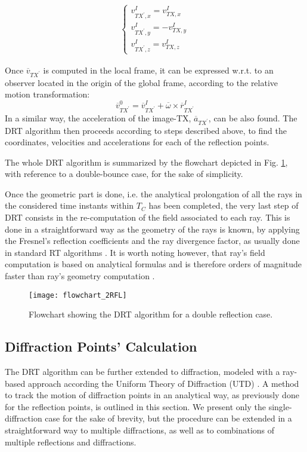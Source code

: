 \begin{equation}
\begin{gathered}
\begin{cases}
v_{TX^{'},x}^{I} = v_{TX,x}^{I} \\
v_{TX^{'},y}^{I} = -v_{TX,y}^{I} \\
v_{TX^{'},z}^{I} = v_{TX,z}^{I}
\end{cases}
\end{gathered} 
\end{equation}

Once $\overline{v}_{TX^{'}}$ is computed in the local frame, it can be expressed w.r.t. to an observer located in the origin of the global frame, according to the relative motion transformation:
\begin{equation}
\overline{v}_{TX^{'}}^{0}=\overline{v}_{TX^{'}}^{I}+\overline{\omega} \times \overline{r}_{TX^{'}}^{I}
\end{equation}
In a similar way, the acceleration of the image-TX, $\overline{a}_{TX^{'}}$, can be also found.
The DRT algorithm then proceeds according to steps described above, to find the coordinates, velocities and accelerations for each of the reflection points.
\par

The whole DRT algorithm is summarized by the flowchart depicted in Fig. \ref{flowchart}, with reference to a double-bounce case, for the sake of simplicity. 

Once the geometric part is done, i.e. the analytical prolongation of all the rays in the considered time instants within $T_C$ has been completed, the very last step of DRT consists in the re-computation of the field associated to each ray. This is done in a straightforward way as the geometry of the rays is known, by applying the Fresnel's reflection coefficients and the ray divergence factor, as usually done in standard RT algorithms \cite{fuschini2015,vitucci2019}. It is worth noting however, that ray's field computation is based on analytical formulas and is therefore orders of magnitude faster than ray's geometry computation \cite{fuschini2015}.

\begin{figure}[h!]
	\centering
	\texttt{[image: flowchart\_2RFL]}
	\caption{Flowchart showing the DRT algorithm for a double reflection case.}
	\label{flowchart}
\end{figure}

\subsection{Diffraction Points' Calculation}
The DRT algorithm can be further extended to diffraction, modeled with a ray-based approach according the Uniform Theory of Diffraction (UTD) \cite{UTD}.
A method to track the motion of diffraction points in an analytical way, as previously done for the reflection points, is outlined in this section. We present only the single-diffraction case for the sake of brevity, but the procedure can be extended in a straightforward way to multiple diffractions, as well as to combinations of multiple reflections and diffractions.


